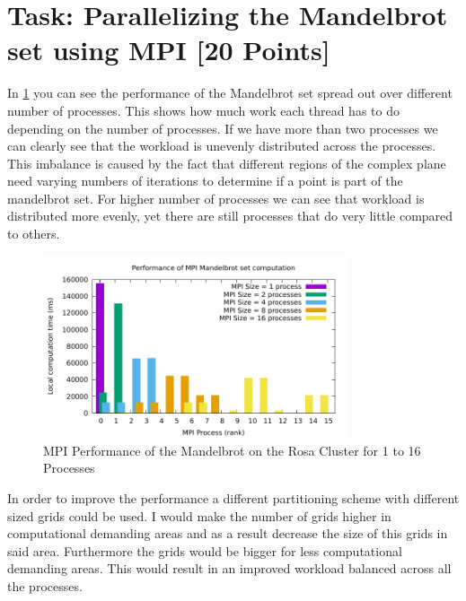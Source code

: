 \section{Task: Parallelizing the Mandelbrot set using MPI [20 Points]}
In \ref{fig:mandel} you can see the performance of the Mandelbrot set spread out over different number of processes. This shows how much work each thread has to do depending on the number of processes. If we have more than two processes we can clearly see that the workload is unevenly distributed across the processes. This imbalance is caused by the fact that different regions of the complex plane need varying numbers of iterations to determine if a point is part of the mandelbrot set. For higher number of processes we can see that workload is distributed more evenly, yet there are still processes that do very little compared to others.
\begin{figure}[H]
	\centering
	\includegraphics[width=0.8\textwidth]{../media/perf.pdf}
	\caption{MPI Performance of the Mandelbrot on the Rosa Cluster for 1 to 16 Processes}
	\label{fig:mandel}
\end{figure}

In order to improve the performance a different partitioning scheme with different sized grids could be used. I would make the number of grids higher in computational demanding areas and as a result decrease the size of this grids in said area. Furthermore the grids would be bigger for less computational demanding areas. This would result in an improved workload balanced across all the processes.
